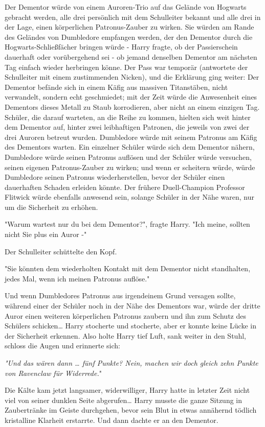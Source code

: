 {Der Dementor würde von einem Auroren-Trio auf das Gelände von Hogwarts gebracht werden, alle drei persönlich mit dem Schulleiter bekannt und alle drei in der Lage, einen körperlichen Patronus-Zauber zu wirken. Sie würden am Rande des Geländes von Dumbledore empfangen werden, der den Dementor durch die Hogwarts-Schließfächer bringen würde - Harry fragte, ob der Passierschein dauerhaft oder vorübergehend sei - ob jemand denselben Dementor am nächsten Tag einfach wieder herbringen könne. Der Pass war temporär (antwortete der Schulleiter mit einem zustimmenden Nicken), und die Erklärung ging weiter: Der Dementor befände sich in einem Käfig aus massiven Titanstäben, nicht verwandelt, sondern echt geschmiedet; mit der Zeit würde die Anwesenheit eines Dementors dieses Metall zu Staub korrodieren, aber nicht an einem einzigen Tag. Schüler, die darauf warteten, an die Reihe zu kommen, hielten sich weit hinter dem Dementor auf, hinter zwei leibhaftigen Patronen, die jeweils von zwei der drei Auroren betreut wurden. Dumbledore würde mit seinem Patronus am Käfig des Dementors warten. Ein einzelner Schüler würde sich dem Dementor nähern, Dumbledore würde seinen Patronus auflösen und der Schüler würde versuchen, seinen eigenen Patronus-Zauber zu wirken; und wenn er scheitern würde, würde Dumbledore seinen Patronus wiederherstellen, bevor der Schüler einen dauerhaften Schaden erleiden könnte. Der frühere Duell-Champion Professor Flitwick würde ebenfalls anwesend sein, solange Schüler in der Nähe waren, nur um die Sicherheit zu erhöhen.

"Warum wartest nur du bei dem Dementor?", fragte Harry. "Ich meine, sollten nicht Sie plus ein Auror -"

Der Schulleiter schüttelte den Kopf.

"Sie könnten dem wiederholten Kontakt mit dem Dementor nicht standhalten, jedes Mal, wenn ich meinen Patronus auflöse."

Und wenn Dumbledores Patronus aus irgendeinem Grund versagen sollte, während einer der Schüler noch in der Nähe des Dementors war, würde der dritte Auror einen weiteren körperlichen Patronus zaubern und ihn zum Schutz des Schülers schicken… Harry stocherte und stocherte, aber er konnte keine Lücke in der Sicherheit erkennen. Also holte Harry tief Luft, sank weiter in den Stuhl, schloss die Augen und erinnerte sich:

\emph{"Und das wären dann … fünf Punkte? Nein, machen wir doch gleich zehn Punkte von Ravenclaw für Widerrede.}"

Die Kälte kam jetzt langsamer, widerwilliger, Harry hatte in letzter Zeit nicht viel von seiner dunklen Seite abgerufen… Harry musste die ganze Sitzung in Zaubertränke im Geiste durchgehen, bevor sein Blut in etwas annähernd tödlich kristalline Klarheit erstarrte. Und dann dachte er an den Dementor.

}

